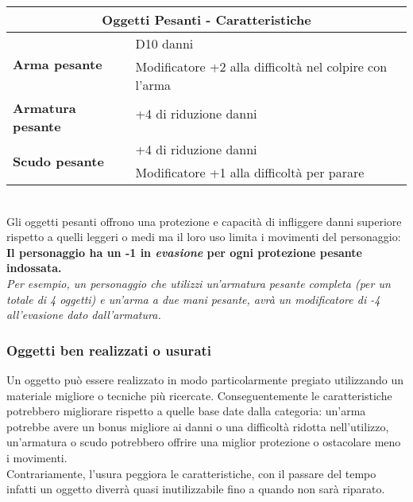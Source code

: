 \documentclass[../manuale_main.tex]{subfiles}
\begin{document}
\renewcommand{\arraystretch}{1.2}
\begin{tabular}{|l l| }
\hline
\multicolumn{2}{|c|}{\textbf{Oggetti Pesanti - Caratteristiche}}\\
\hline
\hline
\multirow{2}{8em}{\textbf{Arma pesante}}&D10 danni \\&Modificatore +2 alla difficoltà nel colpire con l'arma\\
\hline

\multirow{2}{8em}{\textbf{Armatura pesante}}&+4 di riduzione danni\\&\\
\hline

\multirow{2}{8em}{\textbf{Scudo pesante}}&+4 di riduzione danni\\&Modificatore +1 alla difficoltà per parare\\
\hline
\end{tabular}
\mbox{}\\

Gli oggetti pesanti offrono una protezione e capacità di infliggere danni superiore rispetto a quelli leggeri o medi ma il loro uso limita i movimenti del personaggio:\\
\textbf{Il personaggio ha un -1 in \emph{evasione} per ogni protezione pesante indossata.}\\
\textit{Per esempio, un personaggio che utilizzi un'armatura pesante completa (per un totale di 4 oggetti) e un'arma a due mani pesante, avrà un modificatore di -4 all'evasione dato dall'armatura.}

\clearpage

\subsubsection{Oggetti ben realizzati o usurati}

Un oggetto può essere realizzato in modo particolarmente pregiato utilizzando un materiale migliore o tecniche più ricercate. Conseguentemente le caratteristiche potrebbero migliorare rispetto a quelle base date dalla categoria: un'arma potrebbe avere un bonus migliore ai danni o una difficoltà ridotta nell'utilizzo, un'armatura o scudo potrebbero offrire una miglior protezione o ostacolare meno i movimenti.\\
Contrariamente, l'usura peggiora le caratteristiche, con il passare del tempo infatti un oggetto diverrà quasi inutilizzabile fino a quando non sarà riparato.
\end{document}
